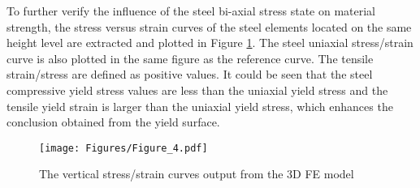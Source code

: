\documentclass[12pt,a4]{article}
\begin{document}
	\par
	To further verify the influence of the steel bi-axial stress state on material strength, the stress versus strain curves of the steel elements located on the same height level are extracted and plotted in Figure \ref{fig-3}. The steel uniaxial stress/strain curve is also plotted in the same figure as the reference curve. The tensile strain/stress are defined as positive values. It could be seen that the steel compressive yield stress values are less than the uniaxial yield stress and the tensile yield strain is larger than the uniaxial yield stress, which enhances the conclusion obtained from the yield surface.
	\par
	\begin{figure}[h]
		\centering
		\texttt{[image: Figures/Figure\_4.pdf]}
		\caption{The vertical stress/strain curves output from the 3D FE model}
		\label{fig-3}
	\end{figure}
	\par
\end{document}

